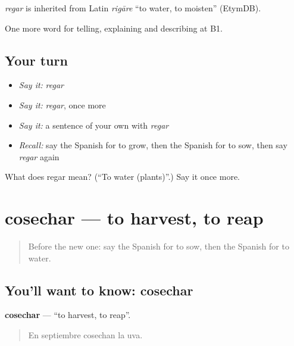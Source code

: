 \begin{cousinweb}
\emph{regar} is inherited from Latin \emph{rigāre} \textquotedblleft{}to water, to moisten\textquotedblright{} (EtymDB).
\end{cousinweb}

\begin{grammarlens}[title={What you've built}]
One more word for telling, explaining and describing at B1.
\end{grammarlens}

\subsection*{Your turn}
\begin{itemize}
\raggedright
  \item \emph{Say it:} \emph{regar}
  \item \emph{Say it:} \emph{regar}, once more
  \item \emph{Say it:} a sentence of your own with \emph{regar}
  \item \emph{Recall:} say the Spanish for to grow, then the Spanish for to sow, then say \emph{regar} again
\end{itemize}

\begin{tcolorbox}[breakable,colback=teal!4,colframe=teal!35!black,title={Before you move on}]
What does regar mean? (\textquotedblleft{}To water (plants)\textquotedblright{}.) Say it once more.
\end{tcolorbox}
\section[cosechar]{cosechar — to harvest, to reap}

\label{lesson:ES-C692-cosechar}



\begin{quote}
Before the new one: say the Spanish for to sow, then the Spanish for to water.
\end{quote}

\subsection*{You'll want to know: cosechar}
\textbf{cosechar} — \textquotedblleft{}to harvest, to reap\textquotedblright{}.

\begin{quote}
En septiembre cosechan la uva.
\end{quote}

